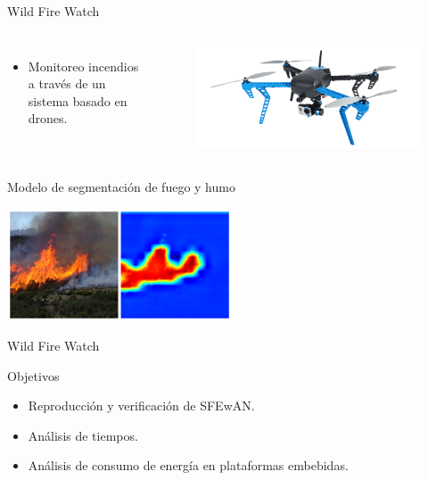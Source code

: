 \begin{frame}{Wild Fire Watch}
	\begin{columns}
	
        \begin{itemize}
        \item Monitoreo incendios a través de un sistema basado en drones. 
        \end{itemize}
        
	\begin{figure}[H]
	\centering

        
 \includegraphics[width=1\textwidth]{fig/iris.png}
	\end{figure}
	\end{columns}
\end{frame}



\begin{frame}{Modelo de segmentación de fuego y humo}

	\centering
 \includegraphics[width=0.5\textwidth]{fig/inferencepic.png}

Wild Fire Watch 
\end{frame}



\begin{frame}{Objetivos}
\begin{itemize}
    \item Reproducción y verificación de SFEwAN. 
    \item Análisis de tiempos. 
    \item Análisis de consumo de energía en plataformas embebidas. 
\end{itemize}
    
\end{frame}

